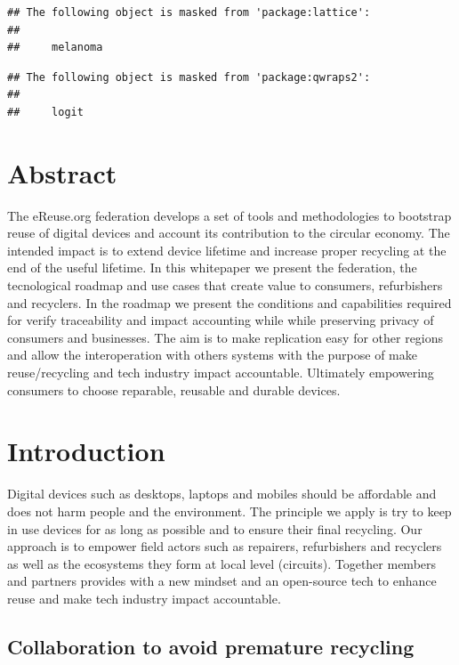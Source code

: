 \documentclass[
]{book}
\begin{document}
\begin{verbatim}
## The following object is masked from 'package:lattice':
## 
##     melanoma
\end{verbatim}

\begin{verbatim}
## The following object is masked from 'package:qwraps2':
## 
##     logit
\end{verbatim}

\hypertarget{abstract}{%
\chapter*{Abstract}\label{abstract}}

The eReuse.org federation develops a set of tools and methodologies to bootstrap reuse of digital devices and account its contribution to the circular economy. The intended impact is to extend device lifetime and increase proper recycling at the end of the useful lifetime. In this whitepaper we present the federation, the tecnological roadmap and use cases that create value to consumers, refurbishers and recyclers. In the roadmap we present the conditions and capabilities required for verify traceability and impact accounting while while preserving privacy of consumers and businesses. The aim is to make replication easy for other regions and allow the interoperation with others systems with the purpose of make reuse/recycling and tech industry impact accountable. Ultimately empowering consumers to choose reparable, reusable and durable devices.

\hypertarget{introduction}{%
\chapter{Introduction}\label{introduction}}

Digital devices such as desktops, laptops and mobiles should be affordable and does not harm people and the environment. The principle we apply is try to keep in use devices for as long as possible and to ensure their final recycling. Our approach is to empower field actors such as repairers, refurbishers and recyclers as well as the ecosystems they form at local level (circuits). Together members and partners provides with a new mindset and an open-source tech to enhance reuse and make tech industry impact accountable.

\hypertarget{collaboration-to-avoid-premature-recycling}{%
\section{Collaboration to avoid premature recycling}\label{collaboration-to-avoid-premature-recycling}}
\end{document}
